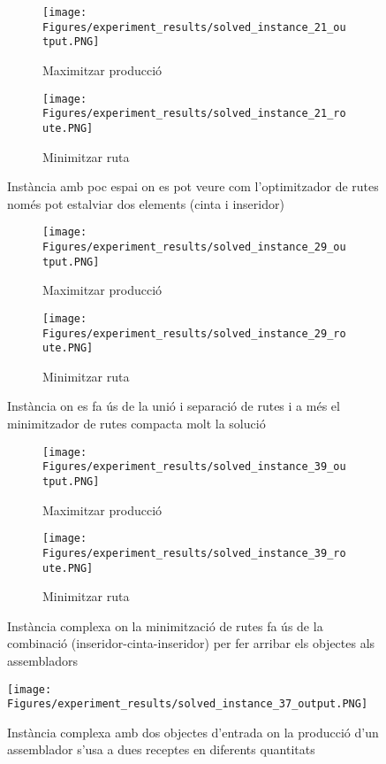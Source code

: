 \begin{figure}[H]
    \centering
    \begin{subfigure}{0.45\textwidth}
        \texttt{[image: Figures/experiment\_results/solved\_instance\_21\_output.PNG]}
        \caption{Maximitzar producció}
    \end{subfigure}
    \hfill
    \begin{subfigure}{0.45\textwidth}
        \texttt{[image: Figures/experiment\_results/solved\_instance\_21\_route.PNG]}
        \caption{Minimitzar ruta}
    \end{subfigure}
    \caption{Instància amb poc espai on es pot veure com l'optimitzador de rutes només pot estalviar dos elements (cinta i inseridor)}
    \label{fig:solved_example_1}
\end{figure}

\begin{figure}[H]
    \centering
    \begin{subfigure}{0.45\textwidth}
        \texttt{[image: Figures/experiment\_results/solved\_instance\_29\_output.PNG]}
        \caption{Maximitzar producció}
    \end{subfigure}
    \hfill
    \begin{subfigure}{0.45\textwidth}
        \texttt{[image: Figures/experiment\_results/solved\_instance\_29\_route.PNG]}
        \caption{Minimitzar ruta}
    \end{subfigure}
    \caption{Instància on es fa ús de la unió i separació de rutes i a més el minimitzador de rutes compacta molt la solució}
    \label{fig:solved_example_2}
\end{figure}

\begin{figure}[H]
    \centering
    \begin{subfigure}{0.45\textwidth}
        \texttt{[image: Figures/experiment\_results/solved\_instance\_39\_output.PNG]}
        \caption{Maximitzar producció}
    \end{subfigure}
    \hfill
    \begin{subfigure}{0.45\textwidth}
        \texttt{[image: Figures/experiment\_results/solved\_instance\_39\_route.PNG]}
        \caption{Minimitzar ruta}
    \end{subfigure}
    \caption{Instància complexa on la minimització de rutes fa ús de la combinació (inseridor-cinta-inseridor) per fer arribar els objectes als assembladors}
    \label{fig:solved_example_3}
\end{figure}

\begin{figure}[H]
    \centering
    \texttt{[image: Figures/experiment\_results/solved\_instance\_37\_output.PNG]}
    \caption{Instància complexa amb dos objectes d'entrada on la producció d'un assemblador s'usa a dues receptes en diferents quantitats}
    \label{fig:solved_example_4}
\end{figure}






